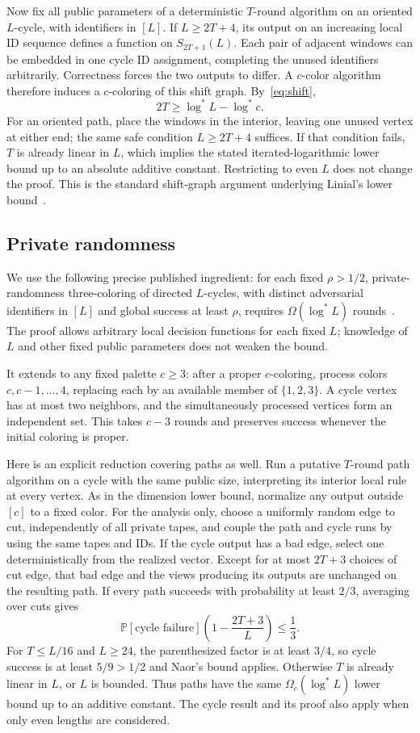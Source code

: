\documentclass[11pt]{article}
\theoremstyle{definition}\newtheorem{definition}[theorem]{Definition}
\theoremstyle{remark}\newtheorem{remark}[theorem]{Remark}
\newcommand{\Prob}{\mathbb P}
\newcommand{\ls}{\log^*}
\begin{document}
Now fix all public parameters of a deterministic $T$-round
algorithm on an oriented $L$-cycle, with identifiers in $[L]$.
If $L\ge2T+4$, its output on an increasing local ID sequence
defines a function on $S_{2T+1}(L)$. Each pair of adjacent
windows can be embedded in one cycle ID assignment, completing
the unused identifiers arbitrarily. Correctness forces the two
outputs to differ. A $c$-color algorithm therefore induces a
$c$-coloring of this shift graph. By~\eqref{eq:shift},
\[
                         2T\ge\ls L-\ls c.
\]
For an oriented path, place the windows in the interior, leaving
one unused vertex at either end; the same safe condition
$L\ge2T+4$ suffices. If that condition fails, $T$ is already
linear in $L$, which implies the stated iterated-logarithmic
lower bound up to an absolute additive constant. Restricting
to even $L$ does not change the proof. This is the standard
shift-graph argument underlying Linial's lower bound~\cite{Linial}.

\subsection{Private randomness}

We use the following precise published ingredient: for each
fixed $\rho>1/2$, private-randomness three-coloring of directed
$L$-cycles, with distinct adversarial identifiers in $[L]$ and
global success at least $\rho$, requires $\Omega(\ls L)$
rounds~\cite[Theorem 2.1]{Naor}. The proof allows arbitrary local
decision functions for each fixed $L$; knowledge of $L$ and
other fixed public parameters does not weaken the bound.

It extends to any fixed palette $c\ge3$: after a proper
$c$-coloring, process colors $c,c-1,\ldots,4$, replacing each
by an available member of $\{1,2,3\}$. A cycle vertex has at
most two neighbors, and the simultaneously processed vertices
form an independent set. This takes $c-3$ rounds and preserves
success whenever the initial coloring is proper.

Here is an explicit reduction covering paths as well. Run a
putative $T$-round path algorithm on a cycle with the same
public size, interpreting its interior local rule at every
vertex. As in the dimension lower bound, normalize any output
outside $[c]$ to a fixed color. For the analysis only, choose a
uniformly random edge to cut, independently
of all private tapes, and couple the path and cycle runs by
using the same tapes and IDs. If the cycle output has a bad
edge, select one deterministically from the realized vector.
Except for at most $2T+3$ choices of cut edge, that bad edge
and the views producing its outputs are unchanged on the
resulting path. If every path succeeds with probability at
least $2/3$, averaging over cuts gives
\[
 \Prob[\text{cycle failure}]\left(1-\frac{2T+3}{L}\right)
                         \le\frac13.
\]
For $T\le L/16$ and $L\ge24$, the parenthesized factor is at
least $3/4$, so cycle success is at least $5/9>1/2$ and Naor's
bound applies. Otherwise $T$ is already linear in $L$, or $L$
is bounded. Thus paths have the same $\Omega_c(\ls L)$ lower
bound up to an additive constant. The cycle result and its
proof also apply when only even lengths are considered.
\end{document}
